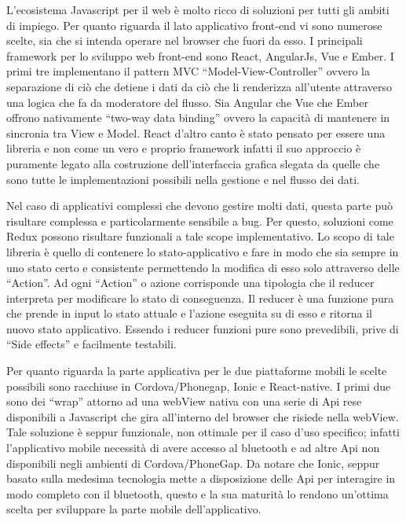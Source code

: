 	L’ecosistema Javascript per il web è molto ricco di soluzioni per tutti gli ambiti di impiego. Per quanto riguarda il lato applicativo front-end vi sono numerose scelte, sia che si intenda operare nel browser che fuori da esso. I principali framework per lo sviluppo web front-end sono React, AngularJs, Vue e Ember. I primi tre implementano il pattern MVC “Model-View-Controller” ovvero la separazione di ciò che detiene i dati da ciò che li renderizza all’utente attraverso una logica che fa da moderatore del flusso. Sia Angular che Vue che Ember offrono nativamente “two-way data binding” ovvero la capacità di mantenere in sincronia tra View e Model. React d’altro canto è stato pensato per essere una libreria e non come un vero e proprio framework infatti il suo approccio è puramente legato alla costruzione dell’interfaccia grafica slegata da quelle che sono tutte le implementazioni possibili nella gestione e nel flusso dei dati. \vspace{5mm}

Nel caso di applicativi complessi che devono gestire molti dati, questa parte può risultare complessa e particolarmente sensibile a bug. Per questo, soluzioni come Redux possono risultare funzionali a tale scope implementativo. Lo scopo di tale libreria è quello di contenere lo stato-applicativo e fare in modo che sia sempre in uno stato certo e consistente permettendo la modifica di esso solo attraverso delle “Action”. Ad ogni “Action” o azione corrisponde una tipologia che il reducer interpreta per modificare lo stato di conseguenza. Il reducer è una funzione pura che prende in input lo stato attuale e l’azione eseguita su di esso e ritorna il nuovo stato applicativo. Essendo i reducer funzioni pure sono prevedibili, prive di “Side effects” e facilmente testabili.\vspace{5mm} 

Per quanto riguarda la parte applicativa per le due piattaforme mobili le scelte possibili sono racchiuse in Cordova/Phonegap, Ionic e React-native. I primi due sono dei “wrap” attorno ad una webView nativa con una serie di Api rese disponibili a Javascript che gira all’interno del browser che risiede nella webView. Tale soluzione è seppur funzionale, non ottimale per il caso d’uso specifico; infatti l’applicativo mobile necessità di avere accesso al bluetooth e ad altre Api non disponibili negli ambienti di Cordova/PhoneGap. Da notare che Ionic, seppur basato sulla medesima tecnologia mette a disposizione delle Api per interagire in modo completo con il bluetooth, questo e la sua maturità lo rendono un'ottima scelta per sviluppare la parte mobile dell’applicativo.\vspace{5mm} 

